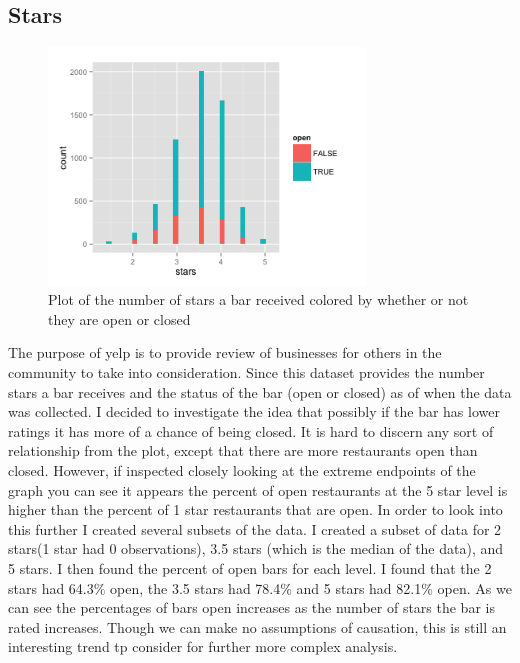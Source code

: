 \documentclass[11pt]{article}
\begin{document}
\subsection{Stars}
\begin{figure}[h!]
  \caption{Plot of the number of stars a bar received colored by whether or not they are open or closed}
  \centering
  \label{open}
    \includegraphics[width=0.75\textwidth]{Figures/barstatus.png}
\end{figure}
The purpose of yelp is to provide review of businesses for others in the community to take into consideration.  Since this dataset provides the number stars a bar receives and the status of the bar (open or closed) as of when the data was collected.  I decided to investigate the idea that possibly if the bar has lower ratings it has more of a chance of being closed.  It is hard to discern any sort of relationship from the plot, except that there are more restaurants open than closed.  However, if inspected closely looking at the extreme endpoints of the graph you can see it appears the percent of open restaurants at the 5 star level is higher than the percent of 1 star restaurants that are open. In order to look into this further I created several subsets of the data.  I created a subset of data for 2 stars(1 star had 0 observations), 3.5 stars (which is the median of the data), and 5 stars.  I then found the percent of open bars for each level.  I found that the 2 stars had 64.3$\%$ open, the 3.5 stars had 78.4$\%$ and 5 stars had 82.1$\%$ open.  As we can see the percentages of bars open increases as the number of stars the bar is rated increases.  Though we can make no assumptions of causation, this is still an interesting trend tp consider for further more complex analysis.
\end{document}
